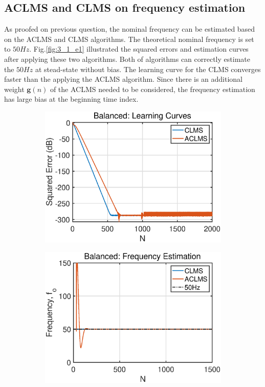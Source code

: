 \subsection{ACLMS and CLMS on frequency estimation}
As proofed on previous question, the nominal frequency can be estimated based on the ACLMS and CLMS algorithms. The theoretical nominal frequency is set to $50Hz$. Fig.\ref{fig:3_1_e1} illustrated the squared errors and estimation curves after applying these two algorithms. Both of algorithms can correctly estimate the $50Hz$ at stead-state without bias. The learning curve for the CLMS converges faster than the applying the ACLMS algorithm. Since there is an additional weight $\mathbf g(n)$ of the ACLMS needed to be considered, the frequency estimation has large bias at the beginning time index. 
\begin{figure}[htb]
    \centering
    \hspace{-0.4cm}
    \begin{subfigure}[b]{0.32\textwidth}
     \centering
     \includegraphics[width=1.2\textwidth]{fig/31/31e1.eps}
    \end{subfigure}
    \hspace{1.4cm}
    \begin{subfigure}[b]{0.32\textwidth}
     \centering
     \includegraphics[width=1.2\textwidth]{fig/31/31e2.eps}

\end{subfigure}
\end{figure}
